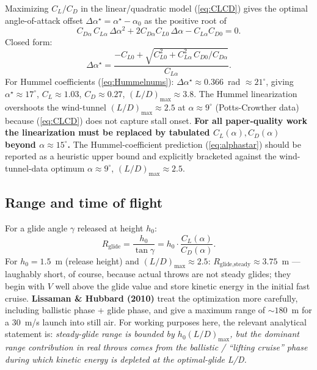 \documentclass[11pt,letterpaper]{article}
\begin{document}
Maximizing $C_L/C_D$ in the linear/quadratic model (\ref{eq:CLCD}) gives the optimal angle-of-attack offset $\Delta\alpha^\star = \alpha^\star - \alpha_0$ as the positive root of
\begin{equation}
C_{D\alpha}\,C_{L\alpha}\,\Delta\alpha^2 + 2 C_{D\alpha} C_{L0}\,\Delta\alpha - C_{L\alpha} C_{D0} = 0.
\end{equation}
Closed form:
\begin{equation}
\Delta\alpha^\star = \frac{-C_{L0} + \sqrt{C_{L0}^2 + C_{L\alpha}^2\,C_{D0}/C_{D\alpha}}}{C_{L\alpha}}.
\label{eq:alphastar}
\end{equation}
For Hummel coefficients (\ref{eq:Hummelnums}): $\Delta\alpha^\star \approx 0.366$~rad $\approx 21^\circ$, giving $\alpha^\star \approx 17^\circ$, $C_L \approx 1.03$, $C_D \approx 0.27$, $(L/D)_{\max} \approx 3.8$. The Hummel linearization overshoots the wind-tunnel $(L/D)_{\max} \approx 2.5$ at $\alpha \approx 9^\circ$ (Potts-Crowther data) because (\ref{eq:CLCD}) does not capture stall onset. \textbf{For all paper-quality work the linearization must be replaced by tabulated $C_L(\alpha), C_D(\alpha)$ beyond $\alpha \approx 15^\circ$.} The Hummel-coefficient prediction (\ref{eq:alphastar}) should be reported as a heuristic upper bound and explicitly bracketed against the wind-tunnel-data optimum $\alpha \approx 9^\circ$, $(L/D)_{\max} \approx 2.5$.

\subsection{Range and time of flight}

For a glide angle $\gamma$ released at height $h_0$:
\begin{equation}
R_{\text{glide}} = \frac{h_0}{\tan\gamma} = h_0 \cdot \frac{C_L(\alpha)}{C_D(\alpha)}.
\end{equation}
For $h_0 = 1.5$~m (release height) and $(L/D)_{\max} \approx 2.5$: $R_{\text{glide,steady}} \approx 3.75$~m --- laughably short, of course, because actual throws are not steady glides; they begin with $V$ well above the glide value and store kinetic energy in the initial fast cruise. \textbf{Lissaman \& Hubbard (2010)} treat the optimization more carefully, including ballistic phase + glide phase, and give a maximum range of $\sim 180$~m for a 30~m/s launch into still air. For working purposes here, the relevant analytical statement is: \emph{steady-glide range is bounded by $h_0 (L/D)_{\max}$, but the dominant range contribution in real throws comes from the ballistic / ``lifting cruise'' phase during which kinetic energy is depleted at the optimal-glide L/D.}
\end{document}
